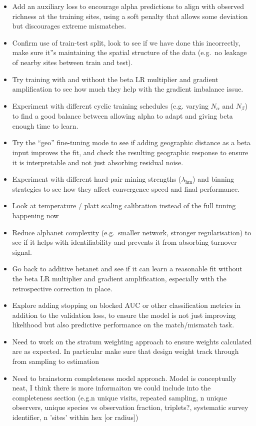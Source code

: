 \documentclass{article}
\begin{document}
\begin{itemize}
    \item Add an auxiliary loss to encourage alpha predictions to align with observed richness at the training sites, using a soft penalty that allows some deviation but discourages extreme mismatches.
    \item Confirm use of train-test split, look to see if we have done this incorrectly, make sure it''s maintaining the spatial structure of the data (e.g.\ no leakage of nearby sites between train and test).
    \item Try training with and without the beta LR multiplier and gradient amplification to see how much they help with the gradient imbalance issue.
    \item Experiment with different cyclic training schedules (e.g. varying $N_\alpha$ and $N_\beta$) to find a good balance between allowing alpha to adapt and giving beta enough time to learn.
    \item Try the ``geo'' fine-tuning mode to see if adding geographic distance as a beta input improves the fit, and check the resulting geographic response to ensure it is interpretable and not just absorbing residual noise.
    \item Experiment with different hard-pair mining strengths ($\lambda_{\text{hm}}$) and binning strategies to see how they affect convergence speed and final performance.
    \item Look at temperature / platt scaling calibration instead of the full tuning happening now
    \item Reduce alphanet complexity (e.g.\ smaller network, stronger regularisation) to see if it helps with identifiability and prevents it from absorbing turnover signal.
    \item Go back to additive betanet and see if it can learn a reasonable fit without the beta LR multiplier and gradient amplification, especially with the retrospective correction in place.
    \item Explore adding stopping on blocked AUC or other classification metrics in addition to the validation loss, to ensure the model is not just improving likelihood but also predictive performance on the match/mismatch task.
    \item Need to work on the stratum weighting approach to ensure weights calculated are as expected. In particular make sure that design weight track through from sampling to estimation
    \item Need to brainstorm completeness model approach. Model is conceptually neat, I think there is more informaiton we could include into the completeness section (e.g.n unique visits, repeated sampling, n unique observers, unique species vs observation fraction, triplets?, systematic survey identifier, n 'sites' within hex [or radius])

\end{itemize}
\end{document}
